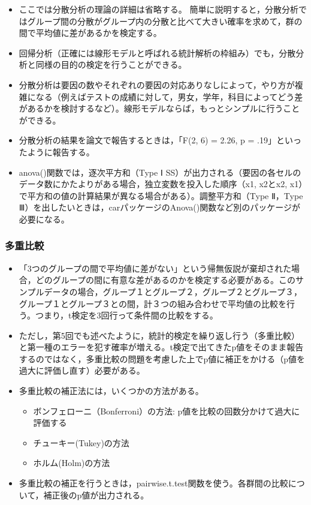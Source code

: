 \documentclass[]{article}
\providecommand{\tightlist}{%
  \setlength{\itemsep}{0pt}\setlength{\parskip}{0pt}}
\begin{document}
\begin{itemize}
\item
  ここでは分散分析の理論の詳細は省略する。
  簡単に説明すると，分散分析ではグループ間の分散がグループ内の分散と比べて大きい確率を求めて，群の間で平均値に差があるかを検定する。
\item
  回帰分析（正確には線形モデルと呼ばれる統計解析の枠組み）でも，分散分析と同様の目的の検定を行うことができる。\\
\item
  分散分析は要因の数やそれぞれの要因の対応ありなしによって，やり方が複雑になる（例えばテストの成績に対して，男女，学年，科目によってどう差があるかを検討するなど）。線形モデルならば，もっとシンプルに行うことができる。\\
\item
  分散分析の結果を論文で報告するときは，「F(2, 6) = 2.26, p =
  .19」といったように報告する。
\item
  anova()関数では，逐次平方和（Type Ⅰ
  SS）が出力される（要因の各セルのデータ数にかたよりがある場合，独立変数を投入した順序（x1,
  x2とx2,
  x1）で平方和の値の計算結果が異なる場合がある）。調整平方和（Type
  Ⅱ，Type
  Ⅲ）を出したいときは，carパッケージのAnova()関数など別のパッケージが必要になる。
\end{itemize}

\subsubsection{多重比較}\label{-1}

\begin{itemize}
\item
  「3つのグループの間で平均値に差がない」という帰無仮説が棄却された場合，どのグループの間に有意な差があるのかを検定する必要がある。このサンプルデータの場合，グループ１とグループ２，グループ２とグループ３，グループ１とグループ３との間，計３つの組み合わせで平均値の比較を行う。つまり，t検定を3回行って条件間の比較をする。
\item
  ただし，第5回でも述べたように，統計的検定を繰り返し行う（多重比較）と第一種のエラーを犯す確率が増える。t検定で出てきたp値をそのまま報告するのではなく，多重比較の問題を考慮した上でp値に補正をかける（p値を過大に評価し直す）必要がある。
\item
  多重比較の補正法には，いくつかの方法がある。

  \begin{itemize}
  \tightlist
  \item
    ボンフェローニ（Bonferroni）の方法:
    p値を比較の回数分かけて過大に評価する\\
  \item
    チューキー(Tukey)の方法\\
  \item
    ホルム(Holm)の方法
  \end{itemize}
\item
  多重比較の補正を行うときは，pairwise.t.test関数を使う。各群間の比較について，補正後のp値が出力される。
\end{itemize}
\end{document}

